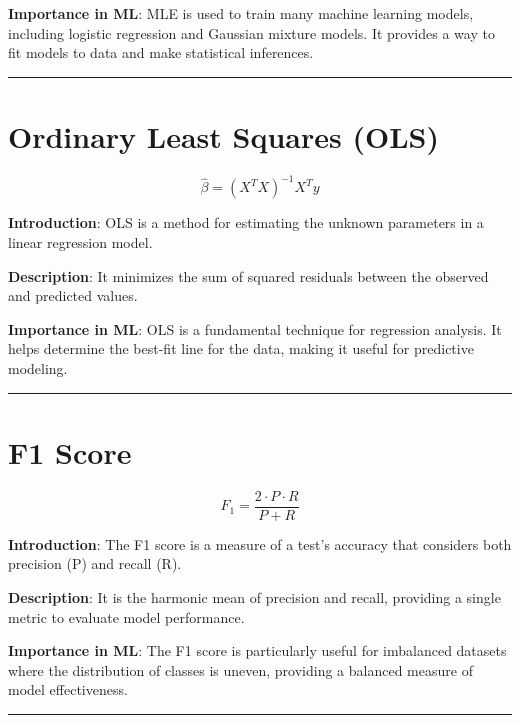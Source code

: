 \documentclass[
  12 pt,
  a4paper,
]{book}
\numberwithin{equation}{section}
\theoremstyle{plain}      %
\theoremstyle{definition} %
\theoremstyle{remark}     %
\theoremstyle{note}         %
\begin{document}
\textbf{Importance in ML}: MLE is used to train many machine learning
models, including logistic regression and Gaussian mixture models. It
provides a way to fit models to data and make statistical inferences.

\begin{center}\rule{0.5\linewidth}{0.5pt}\end{center}

\newpage

\hypertarget{ordinary-least-squares-ols}{%
\chapter{Ordinary Least Squares
(OLS)}\label{ordinary-least-squares-ols}}

\[
\hat{\beta} = (X^T X)^{-1} X^T y
\]

\textbf{Introduction}: OLS is a method for estimating the unknown
parameters in a linear regression model.

\textbf{Description}: It minimizes the sum of squared residuals between
the observed and predicted values.

\textbf{Importance in ML}: OLS is a fundamental technique for regression
analysis. It helps determine the best-fit line for the data, making it
useful for predictive modeling.

\begin{center}\rule{0.5\linewidth}{0.5pt}\end{center}

\newpage

\hypertarget{f1-score}{%
\chapter{F1 Score}\label{f1-score}}

\[
F_1 = \frac{2 \cdot P \cdot R}{P + R}
\]

\textbf{Introduction}: The F1 score is a measure of a test's accuracy
that considers both precision (P) and recall (R).

\textbf{Description}: It is the harmonic mean of precision and recall,
providing a single metric to evaluate model performance.

\textbf{Importance in ML}: The F1 score is particularly useful for
imbalanced datasets where the distribution of classes is uneven,
providing a balanced measure of model effectiveness.

\begin{center}\rule{0.5\linewidth}{0.5pt}\end{center}
\end{document}
